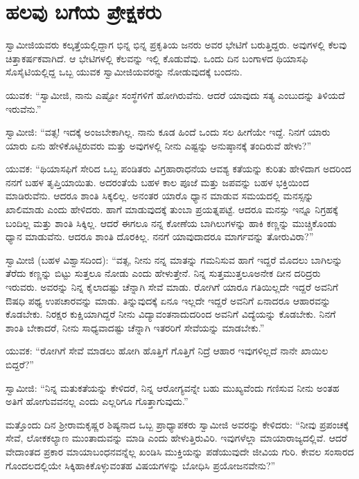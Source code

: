 
\chapter{ಹಲವು ಬಗೆಯ ಪ್ರೇಕ್ಷಕರು}

 ಸ್ವಾಮೀಜಿಯವರು ಕಲ್ಕತ್ತೆಯಲ್ಲಿದ್ದಾಗ ಭಿನ್ನ ಭಿನ್ನ ಪ್ರಕೃತಿಯ ಜನರು ಅವರ ಭೇಟಿಗೆ ಬರುತ್ತಿದ್ದರು. ಅವುಗಳಲ್ಲಿ ಕೆಲವು ಚಿತ್ತಾಕರ್ಷಕವಾಗಿದೆ. ಆ ಭೇಟಿಗಳಲ್ಲಿ ಕೆಲವನ್ನು ಇಲ್ಲಿ ಕೊಡುವೆವು. ಒಂದು ದಿನ ಬಂಗಾಳದ ಥಿಯಾಸಫಿ ಸೊಸೈಟಿಯಲ್ಲಿದ್ದ ಒಬ್ಬ ಯುವಕ ಸ್ವಾಮೀಜಿಯವರನ್ನು ನೋಡುವುದಕ್ಕೆ ಬಂದನು. 

 ಯುವಕ: “ಸ್ವಾಮೀಜಿ, ನಾನು ಎಷ್ಟೋ ಸಂಸ್ಥೆಗಳಿಗೆ ಹೋಗಿರುವೆನು. ಆದರೆ ಯಾವುದು ಸತ್ಯ ಎಂಬುದನ್ನು ತಿಳಿಯದೆ ಇರುವೆನು.” 

 ಸ್ವಾಮೀಜಿ: “ವತ್ಸ! ಇದಕ್ಕೆ ಅಂಜಬೇಕಾಗಿಲ್ಲ. ನಾನು ಕೂಡ ಹಿಂದೆ ಒಂದು ಸಲ ಹೀಗೆಯೇ ಇದ್ದೆ. ನಿನಗೆ ಯಾರು ಯಾರು ಏನು ಹೇಳಿಕೊಟ್ಟಿರುವರು ಮತ್ತು ಅವುಗಳಲ್ಲಿ ನೀನು ಎಷ್ಟನ್ನು ಅನುಷ್ಠಾನಕ್ಕೆ ತಂದಿರುವೆ ಹೇಳು?” 

 ಯುವಕ: “ಥಿಯಾಸಫಿಗೆ ಸೇರಿದ ಒಬ್ಬ ಪಂಡಿತರು ವಿಗ್ರಹಾರಾಧನೆಯ ಆವಶ್ಯ ಕತೆಯನ್ನು ಕುರಿತು ಹೇಳಿದಾಗ ಅದರಿಂದ ನನಗೆ ಬಹಳ ತೃಪ್ತಿಯಾಯಿತು. ಅದರಂತೆಯೆ ಬಹಳ ಕಾಲ ಪೂಜೆ ಮತ್ತು ಜಪವನ್ನು ಬಹಳ ಭಕ್ತಿಯಿಂದ ಮಾಡಿರುವೆನು. ಆದರೂ ಶಾಂತಿ ಸಿಕ್ಕಲಿಲ್ಲ. ಅನಂತರ ಯಾರೊ ಧ್ಯಾನ ಮಾಡುವ ಸಮಯದಲ್ಲಿ ಮನಸ್ಸನ್ನು ಖಾಲಿಮಾಡು ಎಂದು ಹೇಳಿದರು. ಹಾಗೆ ಮಾಡುವುದಕ್ಕೆ ತುಂಬಾ ಪ್ರಯತ್ನಪಟ್ಟೆ. ಆದರೂ ಮನಸ್ಸು ಇನ್ನೂ ನಿಗ್ರಹಕ್ಕೆ ಬಂದಿಲ್ಲ ಮತ್ತು ಶಾಂತಿ ಸಿಕ್ಕಿಲ್ಲ. ಆದರೆ ಈಗಲೂ ನನ್ನ ಕೋಣೆಯ ಬಾಗಿಲುಗಳನ್ನು ಹಾಕಿ ಕಣ್ಣನ್ನು ಮುಚ್ಚಿಕೊಂಡು ಧ್ಯಾನ ಮಾಡುವೆನು. ಆದರೂ ಶಾಂತಿ ದೊರಕಿಲ್ಲ. ನನಗೆ ಯಾವುದಾದರೂ ಮಾರ್ಗವನ್ನು ತೋರುವಿರಾ?”‌ 

 ಸ್ವಾಮೀಜಿ (ಬಹಳ ವಿಶ್ವಾಸದಿಂದ): “ವತ್ಸ, ನೀನು ನನ್ನ ಮಾತನ್ನು ಗಮನಿಸುವ ಹಾಗೆ ಇದ್ದರೆ ಮೊದಲು ಬಾಗಿಲನ್ನು ತೆರೆದು ಕಣ್ಣನ್ನು ಬಿಟ್ಟು ಸುತ್ತಲೂ ನೋಡು ಎಂದು ಹೇಳುತ್ತೇನೆ. ನಿನ್ನ ಸುತ್ತಮುತ್ತಲೂ‌ಅನೇಕ ದೀನ ದರಿದ್ರರು ಇರುವರು. ಅವರನ್ನು ನಿನ್ನ ಕೈಲಾದಷ್ಟು ಚೆನ್ನಾಗಿ ಸೇವೆ ಮಾಡು. ರೋಗಿಗೆ ಯಾರೂ ಗತಿಯಿಲ್ಲದೇ ಇದ್ದರೆ ಅವನಿಗೆ ಔಷಧಿ ಪಥ್ಯ ಉಪಚಾರವನ್ನು ಮಾಡು. ತಿನ್ನುವುದಕ್ಕೆ ಏನೂ ಇಲ್ಲದೇ ಇದ್ದರೆ ಅವನಿಗೆ ಏನಾದರೂ ಆಹಾರವನ್ನು ಕೊಡಬೇಕು. ನಿರಕ್ಷರ ಕುಕ್ಷಿಯಾಗಿದ್ದರೆ ನೀನು ವಿದ್ಯಾವಂತನಾದುದರಿಂದ ಅವನಿಗೆ ವಿದ್ಯೆಯನ್ನು ಕೊಡಬೇಕು. ನಿನಗೆ ಶಾಂತಿ ಬೇಕಾದರೆ, ನೀನು ಸಾಧ್ಯವಾದಷ್ಟು ಚೆನ್ನಾಗಿ ಇತರರಿಗೆ ಸೇವೆಯನ್ನು ಮಾಡಬೇಕು.” 

 ಯುವಕ: “ರೋಗಿಗೆ ಸೇವೆ ಮಾಡಲು ಹೋಗಿ ಹೊತ್ತಿಗೆ ಗೊತ್ತಿಗೆ ನಿದ್ರೆ ಆಹಾರ ಇವುಗಳಿಲ್ಲದೆ ನಾನೇ ಖಾಯಿಲ ಬಿದ್ದರೆ?” 

 ಸ್ವಾಮೀಜಿ: “ನಿನ್ನ ಮತುಕತೆಯನ್ನು ಕೇಳಿದರೆ, ನಿನ್ನ ಆರೋಗ್ಯವನ್ನೇ ಬಹು ಮುಖ್ಯವೆಂದು ಗಣಿಸುವ ನೀನು ಅಂತಹ ಅತಿಗೆ ಹೋಗುವವನಲ್ಲ ಎಂದು ಎಲ್ಲರಿಗೂ ಗೊತ್ತಾಗುವುದು.” 

 ಮತ್ತೊಂದು ದಿನ ಶ‍್ರೀರಾಮಕೃಷ್ಣರ ಶಿಷ್ಯನಾದ ಒಬ್ಬ ಪ್ರಾಧ್ಯಾಪಕರು ಸ್ವಾಮೀಜಿ ಅವರನ್ನು ಕೇಳಿದರು: “ನೀವು ಪ್ರಪಂಚಕ್ಕೆ ಸೇವೆ, ಲೋಕಕಲ್ಯಾಣ ಮುಂತಾದುವನ್ನು ಮಾಡಿ ಎಂದು ಹೇಳುತ್ತಿರುವಿರಿ. ಇವುಗಳೆಲ್ಲಾ ಮಾಯಾರಾಜ್ಯದಲ್ಲಿವೆ. ಆದರೆ ವೇದಾಂತದ ಪ್ರಕಾರ ಮಾಯಾಬಂಧನವನ್ನೆಲ್ಲ ಖಂಡಿಸಿ ಮುಕ್ತಿಯನ್ನು ಪಡೆಯುವುದೇ ಜೀವಿಯ ಗುರಿ. ಕೇವಲ ಸಂಸಾರದ ಗೊಂದಲದಲ್ಲಿಯೇ ಸಿಕ್ಕಿಹಾಕಿಕೊಳ್ಳುವಂತಹ ವಿಷಯಗಳನ್ನು ಬೋಧಿಸಿ ಪ್ರಯೋಜನವೇನು?” 

